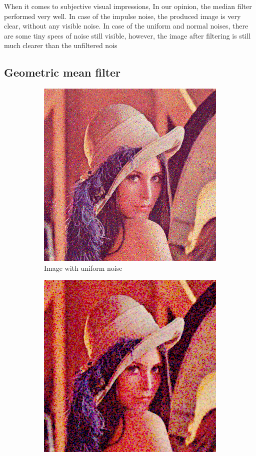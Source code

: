 \documentclass[12pt]{article}
\begin{document}
When it comes to subjective visual impressions,
In our opinion, the median filter performed very well.
In case of the impulse noise, the produced image is very clear, without any visible noise.
In case of the uniform and normal noises, there are some tiny specs of noise still visible,
however, the image after filtering is still much clearer than the unfiltered nois

\clearpage
\subsection{Geometric mean filter}

\begin{figure}[ht]\centering
    \begin{subfigure}[t]{.4\textwidth}\centering
        \includegraphics[width=.8\textwidth]{lenac_uniform3}
        \caption{Image with uniform noise}
    \end{subfigure}
    \begin{subfigure}[t]{.4\textwidth}\centering
        \includegraphics[width=.8\textwidth]{lenac_uniform_gmean}

\end{subfigure}
\end{figure}
\end{document}

